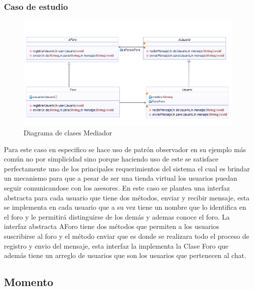 \subsubsection{Caso de estudio}

\begin{figure}[th!]
	\centering
	\includegraphics[width=1\linewidth]{arquitectura/imagenes/DiagramaMediator}
	\caption{Diagrama de clases Mediador}
\end{figure}

Para este caso en especifico se hace uso de patrón observador en su ejemplo más común no por simplicidad sino porque haciendo uso de este se satisface perfectamente uno de los principales requerimientos del sistema el cual es brindar un mecanismo para que a pesar de ser una tienda virtual los usuarios puedan seguir comunicandose con los asesores. \newline
En este caso se plantea una interfaz abstracta para cada usuario que tiene dos métodos, enviar y recibir mensaje, esta se implementa en cada usuario que a su vez tiene un nombre que lo identifica en el foro y le permitirá distinguirse de los demás y ademas conoce el foro. La interfaz abstracta AForo tiene dos métodos que permiten a los usuarios suscribirse al foro y el método enviar que es donde se realizara todo el proceso de registro y envio del mensaje, esta interfaz la implementa la Clase Foro que además tiene un arreglo de usuarios que son los usuarios que pertenecen al chat.

\newpage

\subsection{Momento}
